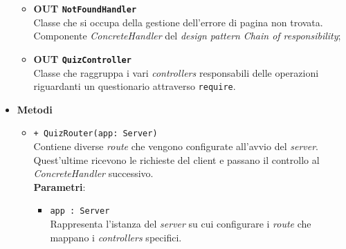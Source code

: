 \begin{itemize}
\begin{itemize}
		\item \textbf{OUT \texttt{NotFoundHandler}} \\
			Classe che si occupa della gestione dell'errore di pagina non trovata. Componente \textit{ConcreteHandler} del \textit{design pattern} \textit{Chain of responsibility};
		\item \textbf{OUT \texttt{QuizController}} \\
			Classe che raggruppa i vari \textit{controllers} responsabili delle operazioni riguardanti un questionario attraverso \texttt{require}.
		\end{itemize}
		\item \textbf{Metodi} 
		\begin{itemize}
		\item \texttt{+ QuizRouter(app: Server)} \\
		Contiene diverse \textit{route} che vengono configurate all'avvio del \textit{server}. Quest'ultime ricevono le richieste del client e passano il controllo al \textit{ConcreteHandler} successivo. \\
		\textbf{Parametri}:
		\begin{itemize}
		\item \texttt{app : Server} \\
		Rappresenta l'istanza del \textit{server} su cui configurare i \textit{route} che mappano i \textit{controllers} specifici.
		\end{itemize}
		\end{itemize}
	\end{itemize}